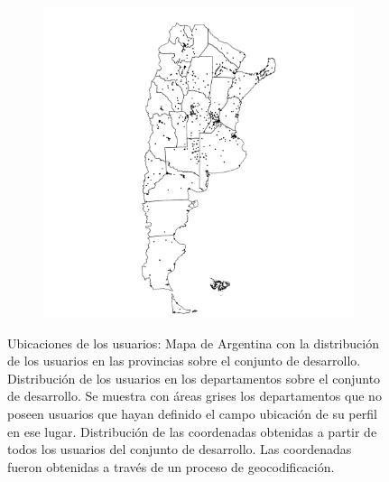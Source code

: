 \begin{figure}[!ht]
\begin{subfigure}[t]{0.31\textwidth}
    \caption{} 
    \label{fig:mapaDepartamentos} 
   \end{subfigure}
   \begin{subfigure}[t]{0.31\textwidth}
    \includegraphics[width=\linewidth]{./images/mapaprovinciasConPuntos.pdf}
    \caption{} 
    \label{fig:mapaPuntos} 
   \end{subfigure}
   



   \caption{Ubicaciones de los usuarios:  Mapa de Argentina con la distribución de los usuarios en las provincias sobre el conjunto de desarrollo.  Distribución de los usuarios en los departamentos sobre el conjunto de desarrollo. Se muestra con áreas grises los departamentos que no poseen usuarios que hayan definido el campo ubicación de su perfil en ese lugar.  Distribución de las coordenadas obtenidas a partir de todos los usuarios del conjunto de desarrollo. Las coordenadas fueron obtenidas a través de un proceso de geocodificación. } 
  \label{fig:busqueda_usuarios} 

\end{figure}

